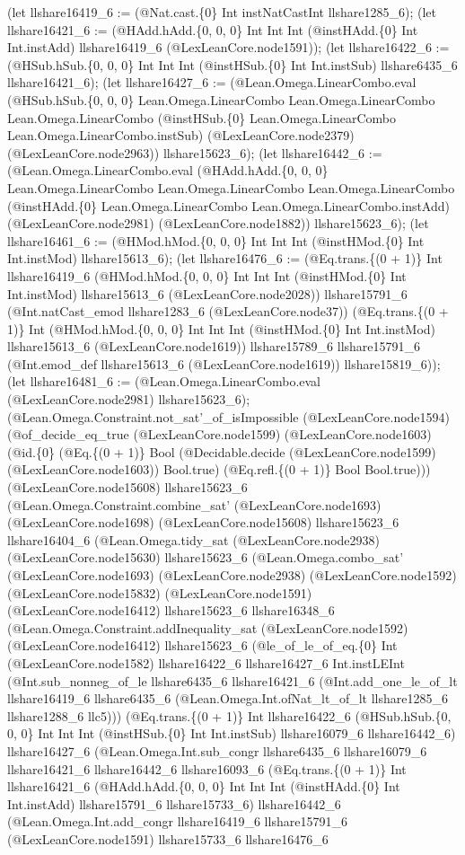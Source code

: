 \documentclass[11pt]{article}
\begin{document}
(let llshare16419\_6 := (@Nat.cast.\{0\} Int instNatCastInt llshare1285\_6); (let llshare16421\_6 := (@HAdd.hAdd.\{0, 0, 0\} Int Int Int (@instHAdd.\{0\} Int Int.instAdd) llshare16419\_6 (@LexLeanCore.node1591)); (let llshare16422\_6 := (@HSub.hSub.\{0, 0, 0\} Int Int Int (@instHSub.\{0\} Int Int.instSub) llshare6435\_6 llshare16421\_6); (let llshare16427\_6 := (@Lean.Omega.LinearCombo.eval (@HSub.hSub.\{0, 0, 0\} Lean.Omega.LinearCombo Lean.Omega.LinearCombo Lean.Omega.LinearCombo (@instHSub.\{0\} Lean.Omega.LinearCombo Lean.Omega.LinearCombo.instSub) (@LexLeanCore.node2379) (@LexLeanCore.node2963)) llshare15623\_6); (let llshare16442\_6 := (@Lean.Omega.LinearCombo.eval (@HAdd.hAdd.\{0, 0, 0\} Lean.Omega.LinearCombo Lean.Omega.LinearCombo Lean.Omega.LinearCombo (@instHAdd.\{0\} Lean.Omega.LinearCombo Lean.Omega.LinearCombo.instAdd) (@LexLeanCore.node2981) (@LexLeanCore.node1882)) llshare15623\_6); (let llshare16461\_6 := (@HMod.hMod.\{0, 0, 0\} Int Int Int (@instHMod.\{0\} Int Int.instMod) llshare15613\_6); (let llshare16476\_6 := (@Eq.trans.\{(0 + 1)\} Int llshare16419\_6 (@HMod.hMod.\{0, 0, 0\} Int Int Int (@instHMod.\{0\} Int Int.instMod) llshare15613\_6 (@LexLeanCore.node2028)) llshare15791\_6 (@Int.natCast\_emod llshare1283\_6 (@LexLeanCore.node37)) (@Eq.trans.\{(0 + 1)\} Int (@HMod.hMod.\{0, 0, 0\} Int Int Int (@instHMod.\{0\} Int Int.instMod) llshare15613\_6 (@LexLeanCore.node1619)) llshare15789\_6 llshare15791\_6 (@Int.emod\_def llshare15613\_6 (@LexLeanCore.node1619)) llshare15819\_6)); (let llshare16481\_6 := (@Lean.Omega.LinearCombo.eval (@LexLeanCore.node2981) llshare15623\_6); (@Lean.Omega.Constraint.not\_sat'\_of\_isImpossible (@LexLeanCore.node1594) (@of\_decide\_eq\_true (@LexLeanCore.node1599) (@LexLeanCore.node1603) (@id.\{0\} (@Eq.\{(0 + 1)\} Bool (@Decidable.decide (@LexLeanCore.node1599) (@LexLeanCore.node1603)) Bool.true) (@Eq.refl.\{(0 + 1)\} Bool Bool.true))) (@LexLeanCore.node15608) llshare15623\_6 (@Lean.Omega.Constraint.combine\_sat' (@LexLeanCore.node1693) (@LexLeanCore.node1698) (@LexLeanCore.node15608) llshare15623\_6 llshare16404\_6 (@Lean.Omega.tidy\_sat (@LexLeanCore.node2938) (@LexLeanCore.node15630) llshare15623\_6 (@Lean.Omega.combo\_sat' (@LexLeanCore.node1693) (@LexLeanCore.node2938) (@LexLeanCore.node1592) (@LexLeanCore.node15832) (@LexLeanCore.node1591) (@LexLeanCore.node16412) llshare15623\_6 llshare16348\_6 (@Lean.Omega.Constraint.addInequality\_sat (@LexLeanCore.node1592) (@LexLeanCore.node16412) llshare15623\_6 (@le\_of\_le\_of\_eq.\{0\} Int (@LexLeanCore.node1582) llshare16422\_6 llshare16427\_6 Int.instLEInt (@Int.sub\_nonneg\_of\_le llshare6435\_6 llshare16421\_6 (@Int.add\_one\_le\_of\_lt llshare16419\_6 llshare6435\_6 (@Lean.Omega.Int.ofNat\_lt\_of\_lt llshare1285\_6 llshare1288\_6 llc5))) (@Eq.trans.\{(0 + 1)\} Int llshare16422\_6 (@HSub.hSub.\{0, 0, 0\} Int Int Int (@instHSub.\{0\} Int Int.instSub) llshare16079\_6 llshare16442\_6) llshare16427\_6 (@Lean.Omega.Int.sub\_congr llshare6435\_6 llshare16079\_6 llshare16421\_6 llshare16442\_6 llshare16093\_6 (@Eq.trans.\{(0 + 1)\} Int llshare16421\_6 (@HAdd.hAdd.\{0, 0, 0\} Int Int Int (@instHAdd.\{0\} Int Int.instAdd) llshare15791\_6 llshare15733\_6) llshare16442\_6 (@Lean.Omega.Int.add\_congr llshare16419\_6 llshare15791\_6 (@LexLeanCore.node1591) llshare15733\_6 llshare16476\_6 
\end{document}
